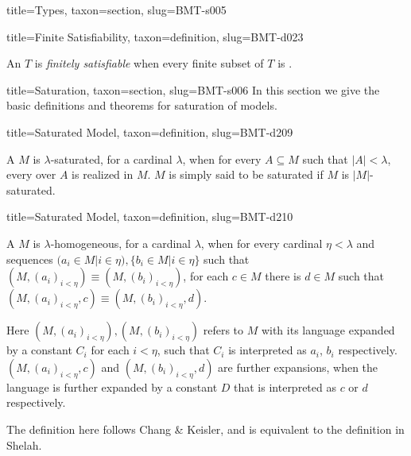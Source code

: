 \documentclass[a4paper]{article}
\begin{document}
\begin{tree}{title={Types}, taxon={section}, slug={BMT-s005}}
\begin{tree}{title={Finite Satisfiability}, taxon={definition}, slug={BMT-d023}}

    An  \(T\) is \emph{finitely satisfiable} when every finite subset of \(T\) is .

\end{tree}

\end{tree}


  
  
\begin{tree}{title={Saturation}, taxon={section}, slug={BMT-s006}}
In this section we give the basic definitions and theorems for saturation of models.
\begin{tree}{title={Saturated Model}, taxon={definition}, slug={BMT-d209}}

    A  \(M\) is \(\lambda\)-saturated, for a cardinal \(\lambda\), when for every \(A \subseteq  M\) such that \(|A|< \lambda\), every  over \(A\) is realized in \(M\). \(M\) is simply said to be saturated if \(M\) is \(|M|\)-saturated.

\end{tree}

\begin{tree}{title={Saturated Model}, taxon={definition}, slug={BMT-d210}}

    A  \(M\) is \(\lambda\)-homogeneous, for a cardinal \(\lambda\), 
    when for every cardinal \(\eta < \lambda\) and sequences \((a_i \in  M|i \in \eta ), \{ b_i \in  M|i \in \eta \}\) such that \((M,(a_i)_{i< \eta }) \equiv (M,(b_i)_{i< \eta })\), 
    for each \(c \in  M\) there is \(d \in  M\) such that \((M,(a_i)_{i< \eta },c) \equiv (M,(b_i)_{i< \eta },d)\). 

    Here \((M,(a_i)_{i< \eta }),(M,(b_i)_{i< \eta })\) refers to \(M\) with its language expanded by a constant \(C_i\) for each \(i< \eta\), such that \(C_i\) is interpreted as \(a_i\), \(b_i\) respectively. 
    \((M,(a_i)_{i< \eta },c)\) and \((M,(b_i)_{i< \eta },d)\) are further expansions, when the language is further expanded by a constant \(D\) that is interpreted as \(c\) or \(d\) respectively.

    The definition here follows Chang & Keisler, and is equivalent to the definition in Shelah.

\end{tree}


\end{tree}
\end{document}
